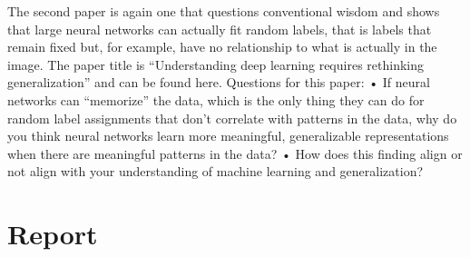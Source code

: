 \documentclass[11pt]{article}
\begin{document}
The second paper is again one that questions conventional wisdom and shows
that large neural networks can actually fit random labels, that is labels that
remain fixed but, for example, have no relationship to what is actually in the
image. The paper title is “Understanding deep learning requires rethinking
generalization” and can be found here.
Questions for this paper:
• If neural networks can “memorize” the data, which is the only thing
they can do for random label assignments that don’t correlate with
patterns in the data, why do you think neural networks learn more
meaningful, generalizable representations when there are meaningful
patterns in the data?
• How does this finding align or not align with your understanding of
machine learning and generalization?

\section{Report}
\end{document}
